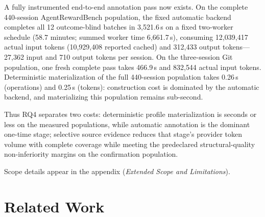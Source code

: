 \documentclass[letterpaper]{article}
\begin{document}
A fully instrumented end-to-end annotation pass now exists. On the
complete 440-session AgentRewardBench population, the fixed automatic backend
completes all 12 outcome-blind batches in 3{,}521.6\,s on a fixed
two-worker schedule (58.7 minutes; summed worker time 6{,}661.7\,s), consuming
12{,}039{,}417 actual input tokens (10{,}929{,}408 reported cached) and
312{,}433 output tokens---27{,}362 input and 710 output tokens per session. On
the three-session Git population, one fresh complete pass takes 466.9\,s and
832{,}544 actual input tokens. Deterministic materialization of the full
440-session population takes 0.26\,s (operations) and 0.25\,s (tokens):
construction cost is dominated by the automatic backend, and materializing
this population remains sub-second.

Thus RQ4 separates two costs: deterministic profile materialization is
seconds or less on the measured populations, while automatic annotation is
the dominant one-time stage; selective source evidence reduces that stage's
provider token volume with complete coverage while meeting the predeclared
structural-quality non-inferiority margins on the confirmation population.

Scope details appear in the appendix (\emph{Extended Scope and Limitations}).


\section{Related Work}
\end{document}
